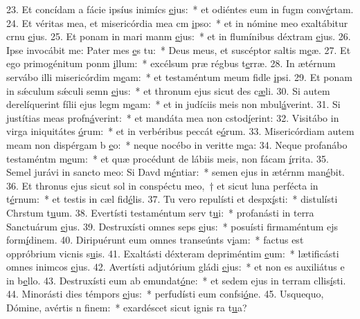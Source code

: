 23. Et concídam a fácie ipsíus inimícs \uline{e}jus:~* et odiéntes eum in fugm conv\uline{é}rtam.
24. Et véritas mea, et misericórdia mea cm \uline{i}pso:~* et in nómine meo exaltábitur crnu \uline{e}jus.
25. Et ponam in mari manm \uline{e}jus:~* et in flumínibus déxtram \uline{e}jus.
26. Ipse invocábit me: Pater mes \uline{e}s tu:~* Deus meus, et suscéptor saltis m\uline{e}æ.
27. Et ego primogénitum ponm \uline{i}llum:~* excélsum præ régbus t\uline{e}rræ.
28. In ætérnum servábo illi misericórdim m\uline{e}am:~* et testaméntum meum fidle \uline{i}psi.
29. Et ponam in sǽculum sǽculi semn \uline{e}jus:~* et thronum ejus sicut des c\uline{æ}li.
30. Si autem derelíquerint fílii ejus legm m\uline{e}am:~* et in judíciis meis non mbul\uline{á}verint.
31. Si justítias meas profn\uline{á}verint:~* et mandáta mea non cstod\uline{í}erint:
32. Visitábo in virga iniquitátes \uline{ó}rum:~* et in verbéribus peccát e\uline{ó}rum.
33. Misericórdiam autem meam non dispérgam b \uline{e}o:~* neque nocébo in veritte m\uline{e}a:
34. Neque profanábo testaméntm m\uline{e}um:~* et quæ procédunt de lábiis meis, non fácam \uline{í}rrita.
35. Semel jurávi in sancto meo: Si Davd m\uline{é}ntiar:~* semen ejus in ætérnm man\uline{é}bit.
36. Et thronus ejus sicut sol in conspéctu meo,~† et sicut luna perfécta in t\uline{é}rnum:~* et testis in cæl fid\uline{é}lis.
37. Tu vero repulísti et despx\uline{í}sti:~* distulísti Chrstum t\uline{u}um.
38. Evertísti testaméntum serv t\uline{u}i:~* profanásti in terra Sanctuárum \uline{e}jus.
39. Destruxísti omnes seps \uline{e}jus:~* posuísti firmaméntum ejs form\uline{í}dinem.
40. Diripuérunt eum omnes transeúnts v\uline{i}am:~* factus est oppróbrium vicnis s\uline{u}is.
41. Exaltásti déxteram depriméntim \uline{e}um:~* lætificásti omnes inimcos \uline{e}jus.
42. Avertísti adjutórium gládi \uline{e}jus:~* et non es auxiliátus e in b\uline{e}llo.
43. Destruxísti eum ab emundat\uline{ó}ne:~* et sedem ejus in terram cllis\uline{í}sti.
44. Minorásti dies témpors \uline{e}jus:~* perfudísti eum confsi\uline{ó}ne.
45. Usquequo, Dómine, avértis n f\uline{i}nem:~* exardéscet sicut ignis ra t\uline{u}a?
